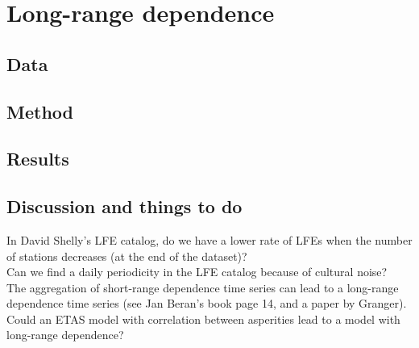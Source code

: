 \documentclass[main.tex]{subfiles}
\begin{document}
\part{Long-range dependence}

\chapter{Data}

\chapter{Method}

\chapter{Results}

\chapter{Discussion and things to do}

In David Shelly's LFE catalog, do we have a lower rate of LFEs when the number of stations decreases (at the end of the dataset)? \\

Can we find a daily periodicity in the LFE catalog because of cultural noise? \\

The aggregation of short-range dependence time series can lead to a long-range dependence time series (see Jan Beran's book page 14, and a paper by Granger). Could an ETAS model with correlation between asperities lead to a model with long-range dependence?
\end{document}
